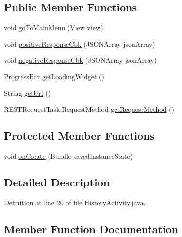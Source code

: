 \subsection*{Public Member Functions}
\begin{DoxyCompactItemize}
\item 
void \hyperlink{classcom_1_1bartekcios_1_1ticketsclient_1_1_history_activity_aebf7d754ef243ee970834b62ec26f478}{go\+To\+Main\+Menu} (View view)
\item 
void \hyperlink{classcom_1_1bartekcios_1_1ticketsclient_1_1_history_activity_afa872a5d1933552d0a7cb87383341dc4}{positive\+Response\+Cbk} (J\+S\+O\+N\+Array json\+Array)
\item 
void \hyperlink{classcom_1_1bartekcios_1_1ticketsclient_1_1_history_activity_af5a8e26d1df9af3be59672b69d72b206}{negative\+Response\+Cbk} (J\+S\+O\+N\+Array json\+Array)
\item 
Progress\+Bar \hyperlink{classcom_1_1bartekcios_1_1ticketsclient_1_1_history_activity_ae2325aef822a47c50ba357b74a212519}{get\+Loading\+Widget} ()
\item 
String \hyperlink{classcom_1_1bartekcios_1_1ticketsclient_1_1_history_activity_a3cb43e0b991a2d216dafe1c561a04467}{get\+Url} ()
\item 
R\+E\+S\+T\+Request\+Task.\+Request\+Method \hyperlink{classcom_1_1bartekcios_1_1ticketsclient_1_1_history_activity_a471ac9b48e59349cae711971d15ae8ad}{get\+Request\+Method} ()
\end{DoxyCompactItemize}
\subsection*{Protected Member Functions}
\begin{DoxyCompactItemize}
\item 
void \hyperlink{classcom_1_1bartekcios_1_1ticketsclient_1_1_history_activity_a43936d793a330a8323a010a2b47bacbc}{on\+Create} (Bundle saved\+Instance\+State)
\end{DoxyCompactItemize}


\subsection{Detailed Description}


Definition at line 20 of file History\+Activity.\+java.



\subsection{Member Function Documentation}
\mbox{\label{classcom_1_1bartekcios_1_1ticketsclient_1_1_history_activity_ae2325aef822a47c50ba357b74a212519}} 
